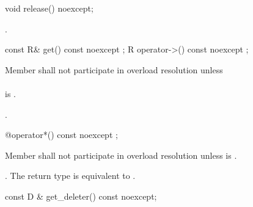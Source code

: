 \documentclass[ebook,11pt,article]{memoir}
\begin{document}

\begin{itemdecl}
void release() noexcept;
\end{itemdecl}

\begin{itemdescr}
\pnum
\effects {}.
\end{itemdescr}


\begin{itemdecl}
const R& get() const noexcept ;
R operator->() const noexcept ;
\end{itemdecl}

\begin{itemdescr}
\pnum
\remarks Member
 shall not participate in overload resolution unless \\
\\
 is . 

\pnum
\returns {}.
\end{itemdescr}

\begin{itemdecl}
@\seebelow@ operator*() const noexcept ;
\end{itemdecl}

\begin{itemdescr}
\pnum
\remarks Member  shall not participate in overload resolution unless  is .

\pnum
\returns {}. The return type is equivalent to 
. 
\end{itemdescr}


\begin{itemdecl}
const D & get_deleter() const noexcept;
\end{itemdecl}

\begin{itemdescr}
\pnum
\returns {}
\end{itemdescr}
\end{document}
